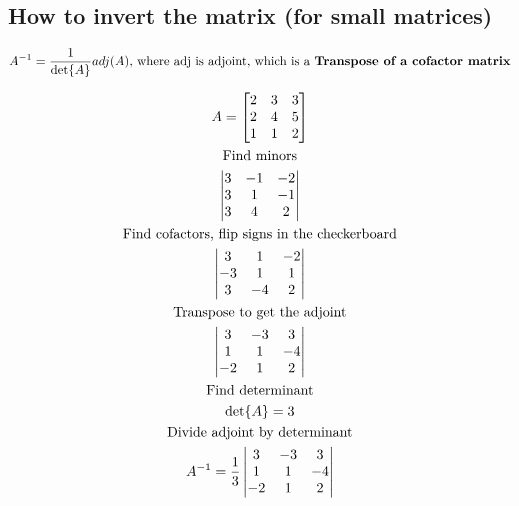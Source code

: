 \documentclass{article}
\begin{document}
    \subsection{How to invert the matrix (for small matrices)}
    \begin{gather*}
        A^{-1}=\frac{1}{\det{A}}adj(A)\text{, where adj is adjoint, which is a \textbf{Transpose of a cofactor matrix}}\\
    \end{gather*}

    \begin{example}
        \begin{gather*}
            A=\bmqty{2 & 3 & 3\\
            2 & 4 & 5 \\
            1 & 1 & 2}\\
            \text{Find minors}\\
            \vmqty{3 & -1 & -2\\
            3 & 1 & -1\\
            3 & 4 & 2}\\
            \text{Find cofactors, flip signs in the checkerboard}\\
            \vmqty{3 & 1 & -2\\
            -3 & 1 & 1\\
            3 & -4 & 2}\\
            \text{Transpose to get the adjoint}\\
            \vmqty{3 & -3 & 3\\
            1 & 1 & -4\\
            -2 & 1 & 2}\\
            \text{Find determinant}\\
            \det{A}=3\\
            \text{Divide adjoint by determinant}\\
            A^{-1}=\frac{1}{3}\vmqty{3 & -3 & 3\\
            1 & 1 & -4\\
            -2 & 1 & 2}\\
        \end{gather*}
    \end{example}
\end{document}
